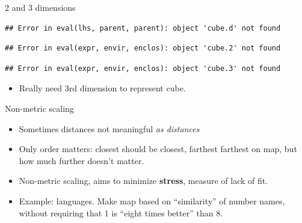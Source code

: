 \documentclass[ignorenonframetext,]{beamer}
\newenvironment{Shaded}{\begin{snugshade}}{\end{snugshade}}
\newcommand{\DataTypeTok}[1]{\textcolor[rgb]{0.13,0.29,0.53}{#1}}
\newcommand{\DecValTok}[1]{\textcolor[rgb]{0.00,0.00,0.81}{#1}}
\newcommand{\FloatTok}[1]{\textcolor[rgb]{0.00,0.00,0.81}{#1}}
\newcommand{\KeywordTok}[1]{\textcolor[rgb]{0.13,0.29,0.53}{\textbf{#1}}}
\newcommand{\NormalTok}[1]{#1}
\newcommand{\OperatorTok}[1]{\textcolor[rgb]{0.81,0.36,0.00}{\textbf{#1}}}
\newcommand{\StringTok}[1]{\textcolor[rgb]{0.31,0.60,0.02}{#1}}
\providecommand{\tightlist}{%
  \setlength{\itemsep}{0pt}\setlength{\parskip}{0pt}}
\begin{document}
\begin{frame}[fragile]{2 and 3 dimensions}
\protect\hypertarget{and-3-dimensions}{}

\begin{Shaded}
\end{Shaded}

\begin{verbatim}
## Error in eval(lhs, parent, parent): object 'cube.d' not found
\end{verbatim}

\begin{Shaded}
\end{Shaded}

\begin{verbatim}
## Error in eval(expr, envir, enclos): object 'cube.2' not found
\end{verbatim}

\begin{Shaded}
\end{Shaded}

\begin{verbatim}
## Error in eval(expr, envir, enclos): object 'cube.3' not found
\end{verbatim}

\begin{itemize}
\tightlist
\item
  Really need 3rd dimension to represent cube.
\end{itemize}

\end{frame}

\begin{frame}{Non-metric scaling}
\protect\hypertarget{non-metric-scaling}{}

\begin{itemize}
\item
  Sometimes distances not meaningful \emph{as distances}
\item
  Only order matters: closest should be closest, farthest farthest on
  map, but how much further doesn't matter.
\item
  Non-metric scaling, aims to minimize \textbf{stress}, measure of lack
  of fit.
\item
  Example: languages. Make map based on ``similarity'' of number names,
  without requiring that 1 is ``eight times better'' than 8.
\end{itemize}

\end{frame}
\end{document}
